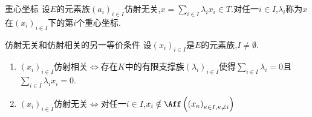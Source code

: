 \begin{definition}{重心坐标}{}
	设$E$的元素族$\left(a_{i}\right)_{i\in I}$仿射无关,$x=\sum\limits_{i\in I}\lambda_{i}x_{i}\in T$.对任一$i\in I$,$\lambda_{i}$称为$x$在$\left(x_{i}\right)_{i\in I}$下的第$i$个重心坐标.
\end{definition}

\begin{proposition}{仿射无关和仿射相关的另一等价条件}{}
	设$\left(x_{i}\right)_{i\in I}$是$E$的元素族,$I\neq\emptyset$.
	\begin{enumerate}
		\item $\left(x_{i}\right)_{i\in I}$仿射相关$\iff$存在$K$中的有限支撑族$\left(\lambda_{i}\right)_{i\in I}$使得$\sum\limits_{i\in I}\lambda_{i}=0$且$\sum\limits_{i\in I}\lambda_{i}x_{i}=0$.
		\item $\left(x_{i}\right)_{i\in I}$仿射无关$\iff$对任一$i\in I$,$x_{i}\notin\Aff\left(\left(x_{\kappa}\right)_{\kappa\in I,\kappa\neq i}\right)$
	\end{enumerate}
\end{proposition}

